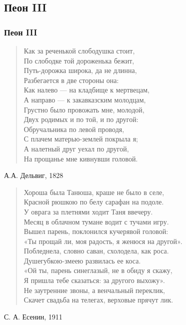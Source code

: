 \documentclass{beamer}
\begin{document}
%
\subsection{Пеон III}\label{sec:sum3}

\begin{frame}
\frametitle{Пеон III}

\begin{verse}
Как за р\alert{е}ченькой слоб\alert{о}душка сто\alert{и}т,\\
По слоб\alert{о}дке той дор\alert{о}женька беж\alert{и}т,\\
Путь-дор\alert{о}жка широк\alert{а}, да не длинн\alert{а},\\
Разбег\alert{а}ется в две ст\alert{о}роны он\alert{а}:\\
Как налево — на кладбище к мертвецам,\\
А направо — к закавказским молодцам,\\
Грустно было провожать мне, молодой,\\
Двух родимых и по той, и по другой:\\
Обручальника по левой проводя,\\
С плачем матерью-землей покрыла я;\\
А налетный друг уехал по другой,\\
На прощанье мне кивнувши головой.
\end{verse}
А.А. Дельвиг, 1828
\end{frame}

%

\begin{frame}


\begin{verse}
Хорош\alert{а} была Тан\alert{ю}ша, краше н\alert{е} было в сел\alert{е},\\
Красной р\alert{ю}шкою по б\alert{е}лу сараф\alert{а}н на подол\alert{е}.\\
У овр\alert{а}га за плетн\alert{я}ми ходит Т\alert{а}ня ввечер\alert{у}.\\
Месяц в \alert{о}блачном тум\alert{а}не водит с т\alert{у}чами игр\alert{у}.\\
Вышел парень, поклонился кучерявой головой:\\
«Ты прощай ли, моя радость, я женюся на другой».\\
Побледнела, словно саван, схолодела, как роса.\\
Душегубкою-змеею развилась ее коса.\\
«Ой ты, парень синеглазый, не в обиду я скажу,\\
Я пришла тебе сказаться: за другого выхожу».\\
Не заутренние звоны, а венчальный переклик,\\
Скачет свадьба на телегах, верховые прячут лик.
\end{verse}
С. А. Есенин, 1911
\end{frame}
\end{document}
